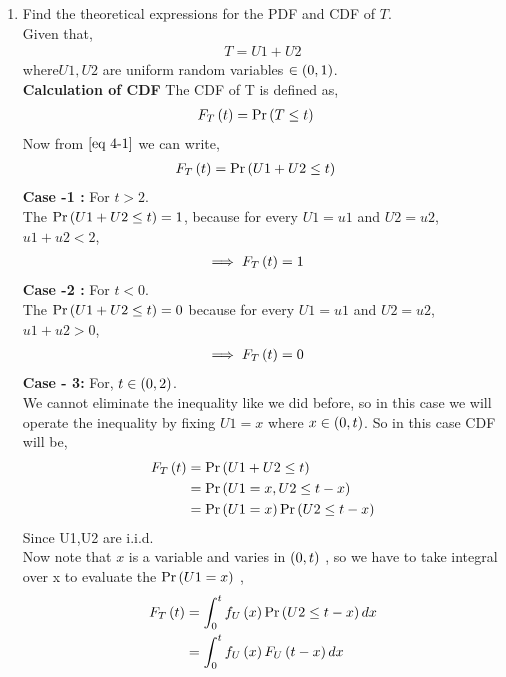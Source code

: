 \documentclass[journal,12pt,twocolumn]{IEEEtran}
\begin{document}
\begin{enumerate}[label=\thesection.\arabic*
,ref=\thesection.\theenumi]
\begin{enumerate}[label=\thesection.\arabic*
,ref=\thesection.\theenumi]
\begin{figure}
  \caption{The PDF of $T$}
  \label{fig:tri_pdf}
 \end{figure}
\item Find the theoretical expressions for the PDF and CDF of $T$.\\
  \solution Given that,
   \begin{align}
           T = U1 + U2 \label{eq 4-1} 
   \end{align}
where$ U1, U2 $ are uniform random variables $\in \left(0,1\right)$.\\
 \textbf{Calculation of CDF}
The CDF of T is defined as,
   \begin{align}
            F_{T}\left(t\right) &= \Pr\left(T \leq t\right)
   \end{align}
  Now from $\eqref{eq 4-1}$ we can write,
   \begin{align}
           F_{T}\left(t\right)  &= \Pr\left(U1 + U2 \leq t\right)
   \end{align}
 \textbf{Case -1 :} For $ t> 2$.\\
  The $\Pr\left( U1 + U2 \leq t\right) = 1$, because for every $ U1 = u1$ and $U2 = u2$, $u1 + u2 <2$,
   \begin{align}
           \implies F_{T}\left(t\right) &= 1 
   \end{align}
 \textbf{Case -2 :} For $ t<0$.\\
  The $\Pr\left( U1 + U2 \leq t\right) = 0$ because for every $ U1 = u1$ and $U2 = u2$, $u1 + u2 >0$,
   \begin{align}
           \implies F_{T}\left(t\right) &= 0 
   \end{align}
 \textbf{Case - 3:} For, $ t \in \left(0,2\right) $.\\
  We cannot eliminate the inequality like we did before, so in this case we will operate the inequality by fixing $U1 = x$ where $x\in \left(0,t\right) $. So in this case CDF will be,
   \begin{align}
           F_{T}\left(t\right)  &= \Pr\left(U1 + U2 \leq t\right)\\
                          &= \Pr\left(U1 = x,U2 \leq t-x\right)\\
                          &= \Pr\left(U1 = x\right)\Pr\left(U2 \leq t-x\right)  
   \end{align}
 Since U1,U2 are i.i.d.\\
  Now note that $ x$ is a variable and varies in $\left(0,t\right)$ , so we have to take integral over x to evaluate the $\Pr\left(U1=x\right)$ ,
   \begin{align}
           F_{T}\brak{t} &= \int_{0}^{t} f_{U}\brak{x}\pr{U2 \leq t-x} dx\\
                         & =\int_{0}^{t} f_{U}\brak{x}F_{U}\brak{t-x} dx

\end{align}
\end{enumerate}
\end{enumerate}
\end{document}
